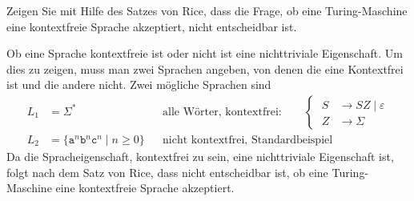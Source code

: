 Zeigen Sie mit Hilfe des Satzes von Rice, dass die Frage, ob eine
Turing-Maschine eine kontextfreie Sprache akzeptiert, nicht entscheidbar
ist.

\begin{loesung}
Ob eine Sprache kontextfreie ist oder nicht ist eine nichttriviale
Eigenschaft.
Um dies zu zeigen, muss man zwei Sprachen angeben, von denen die eine
Kontextfrei ist und die andere nicht.
Zwei mögliche Sprachen sind
\begin{align*}
L_1
&=
\Sigma^*&&\text{alle Wörter, kontextfrei:}
\qquad
\left\{
\;
\begin{aligned}
S&\to SZ\mid \varepsilon\\
Z&\to \Sigma
\end{aligned}
\right.
\\
L_2
&=
\{\texttt{a}^n\texttt{b}^n\texttt{c}^n
\mid
n\ge 0
\}
&&\text{nicht kontextfrei, Standardbeispiel}
\end{align*}
Da die Spracheigenschaft, kontextfrei zu sein, eine nichttriviale
Eigenschaft ist, folgt nach dem Satz von Rice, dass nicht entscheidbar
ist, ob eine Turing-Maschine eine kontextfreie Sprache akzeptiert.
\end{loesung}
